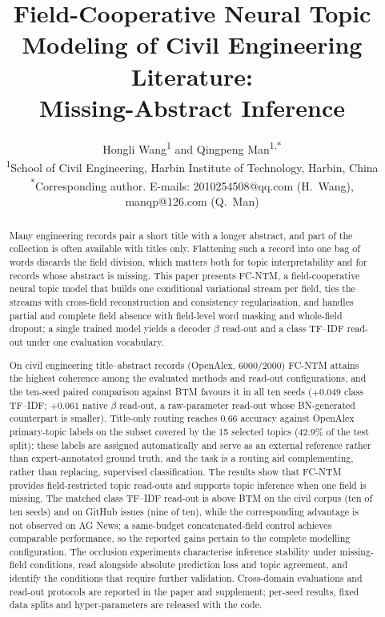 \documentclass[11pt]{article}
\title{\bfseries Field-Cooperative Neural Topic Modeling of Civil Engineering Literature:\\
Missing-Abstract Inference}
\author{Hongli Wang\textsuperscript{1} and Qingpeng Man\textsuperscript{1,*}\\[6pt]
\small\textsuperscript{1}School of Civil Engineering, Harbin Institute of Technology, Harbin, China\\
\small\textsuperscript{*}Corresponding author. E-mails: 2010254508@qq.com (H.~Wang), manqp@126.com (Q.~Man)}
\date{}
\newcommand{\fcntm}{FC-NTM}
\begin{document}
\maketitle

\begin{abstract}
Many engineering records pair a short title with a longer abstract, and part of the collection is
often available with titles only. Flattening such a record into one bag of words discards the
field division, which matters both for topic interpretability and for records whose abstract is
missing. This paper presents \fcntm{}, a field-cooperative neural topic model that builds one
conditional variational stream per field, ties the streams with cross-field reconstruction and
consistency regularisation, and handles partial and complete field absence with field-level word
masking and whole-field dropout; a single trained model yields a decoder $\beta$ read-out and a
class TF--IDF read-out under one evaluation vocabulary.

On civil engineering title--abstract records (OpenAlex, 6000/2000) \fcntm{} attains the highest
coherence among the evaluated methods and read-out configurations, and the ten-seed paired
comparison against BTM favours it in all ten seeds ($+0.049$ class TF--IDF; $+0.061$ native
$\beta$ read-out, a raw-parameter read-out whose BN-generated counterpart is smaller). Title-only routing reaches 0.66 accuracy against OpenAlex primary-topic labels on the subset covered by the 15 selected topics (42.9\% of the test split); these labels are assigned automatically and serve as an external reference rather than expert-annotated ground truth, and the task is a routing aid complementing, rather than replacing, supervised classification. The results show that \fcntm{} provides field-restricted topic read-outs and supports topic inference
when one field is missing. The matched class TF--IDF read-out is above BTM on the civil corpus (ten
of ten seeds) and on GitHub issues (nine of ten), while the corresponding advantage is not observed
on AG News; a same-budget concatenated-field control achieves comparable performance, so the reported
gains pertain to the complete modelling configuration. The occlusion experiments characterise
inference stability under missing-field conditions, read alongside absolute prediction loss and topic
agreement, and identify the conditions that require further validation. Cross-domain evaluations
and read-out protocols are reported in the paper and supplement; per-seed results, fixed data
splits and hyper-parameters are released with the code.
\end{abstract}
\end{document}
